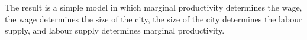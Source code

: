 

The result is a simple model in which marginal productivity determines the wage, the wage determines the size of the city, the size of the city determines the labour supply, and labour supply determines marginal productivity. 





